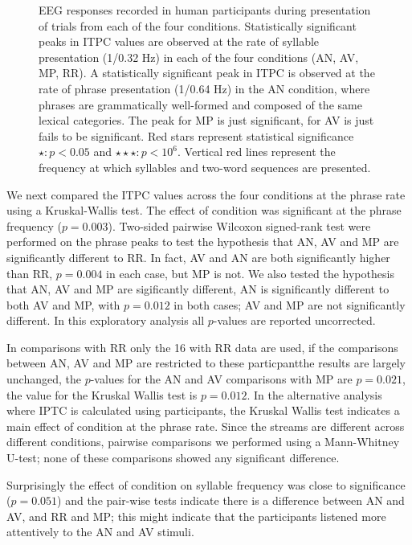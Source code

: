 \documentclass[10pt,letterpaper]{article}
\begin{document}
\begin{figure}[tbhp]

\caption{EEG responses recorded in human participants during
  presentation of trials from each of the four
  conditions. Statistically significant peaks in ITPC values are
  observed at the rate of syllable presentation (1/0.32 Hz) in each of
  the four conditions (AN, AV, MP, RR). A statistically significant
  peak in ITPC is observed at the rate of phrase presentation (1/0.64
  Hz) in the AN condition, where phrases are grammatically well-formed
  and composed of the same lexical categories. The peak for MP is just
  significant, for AV is just fails to be significant. Red stars
  represent statistical significance $\star: p<0.05$ and
  $\star\star\star: p<10^{6}$. Vertical red lines represent the
  frequency at which syllables and two-word sequences are presented.}
\label{fig:Fig2}
\end{figure}
\color{blue}

We next compared the ITPC values across the four conditions at the
phrase rate using a Kruskal-Wallis test. The effect of
condition was significant at the phrase frequency
($p=0.003$). Two-sided pairwise Wilcoxon signed-rank test were
performed on the phrase peaks to test the hypothesis that AN, AV and
MP are significantly different to RR. In fact, AV and AN are both
significantly higher than RR, $p=0.004$ in each case, but MP is
not. We also tested the hypothesis that AN, AV and MP are sigificantly
different, AN is significantly different to both AV and MP, with
$p=0.012$ in both cases; AV and MP are not significantly different. In
this exploratory analysis all $p$-values are reported
uncorrected.


In comparisons with RR only the 16 with RR data are used, if the
comparisons between AN, AV and MP are restricted to these
particpantthe results are largely unchanged, the $p$-values for the AN
and AV comparisons with MP are $p=0.021$, the value for the Kruskal
Wallis test is $p=0.012$. In the alternative analysis where IPTC is
calculated using participants, the Kruskal Wallis test indicates a
main effect of condition at the phrase rate. Since the streams are
different across different conditions, pairwise comparisons we
performed using a Mann-Whitney U-test; none of these comparisons
showed any significant difference.


Surprisingly the effect of condition on syllable frequency was close
to significance ($p=0.051$) and the pair-wise tests indicate there is
a difference between AN and AV, and RR and MP; this might indicate
that the participants listened more attentively to the AN and AV
stimuli.
\end{document}
